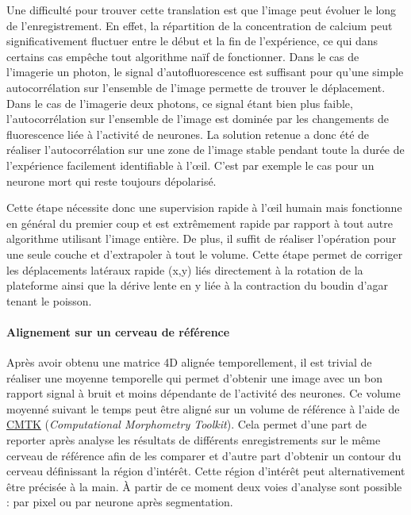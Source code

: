 Une difficulté pour trouver cette translation est que l'image peut évoluer le long de l'enregistrement. En effet, la répartition de la concentration de calcium peut significativement fluctuer entre le début et la fin de l'expérience, ce qui dans certains cas empêche tout algorithme naïf de fonctionner. Dans le cas de l'imagerie un photon, le signal d'autofluorescence est suffisant pour qu'une simple autocorrélation sur l'ensemble de l'image permette de trouver le déplacement. Dans le cas de l'imagerie deux photons, ce signal étant bien plus faible, l'autocorrélation sur l'ensemble de l'image est dominée par les changements de fluorescence liée à l'activité de neurones. La solution retenue a donc été de réaliser l'autocorrélation sur une zone de l'image stable pendant toute la durée de l'expérience facilement identifiable à l'œil. C'est par exemple le cas pour un neurone mort qui reste toujours dépolarisé.

Cette étape nécessite donc une supervision rapide à l'œil humain mais fonctionne en général du premier coup et est extrêmement rapide par rapport à tout autre algorithme utilisant l'image entière. De plus, il suffit de réaliser l'opération pour une seule couche et d'extrapoler à tout le volume. Cette étape permet de corriger les déplacements latéraux rapide (x,y) liés directement à la rotation de la plateforme ainsi que la dérive lente en y liée à la contraction du boudin d'agar tenant le poisson.

\paragraph{Alignement sur un cerveau de référence}

Après avoir obtenu une matrice 4D alignée temporellement, il est trivial de réaliser une moyenne temporelle qui permet d'obtenir une image avec un bon rapport signal à bruit et moins dépendante de l'activité des neurones. Ce volume moyenné suivant le temps peut être aligné sur un volume de référence à l'aide de \href{https://www.nitrc.org/projects/cmtk}{CMTK} (\emph{Computational Morphometry Toolkit}). Cela permet d'une part de reporter après analyse les résultats de différents enregistrements sur le même cerveau de référence afin de les comparer et d'autre part d'obtenir un contour du cerveau définissant la région d'intérêt. Cette région d'intérêt peut alternativement être précisée à la main. À partir de ce moment deux voies d'analyse sont possible : par pixel ou par neurone après segmentation.

